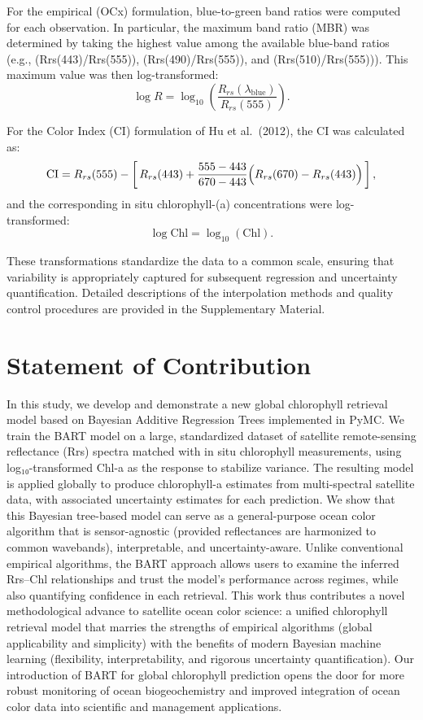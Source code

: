 \documentclass[
]{agujournal2019}
\begin{document}
For the empirical (OCx) formulation, blue-to-green band ratios were
computed for each observation. In particular, the maximum band ratio
(MBR) was determined by taking the highest value among the available
blue-band ratios (e.g., (Rrs(443)/Rrs(555)), (Rrs(490)/Rrs(555)), and
(Rrs(510)/Rrs(555))). This maximum value was then log-transformed: \[
\log R = \log_{10}\left(\frac{R_{rs}(\lambda_{\text{blue}})}{R_{rs}(555)}\right).
\]

For the Color Index (CI) formulation of Hu et al.~(2012), the CI was
calculated as: \[
\text{CI} = R_{rs}(555) - \left[\,R_{rs}(443) + \frac{555-443}{670-443}\Bigl(R_{rs}(670) - R_{rs}(443)\Bigr)\,\right],
\] and the corresponding in situ chlorophyll-(a) concentrations were
log-transformed: \[
\log \text{Chl} = \log_{10}(\text{Chl}).
\]

These transformations standardize the data to a common scale, ensuring
that variability is appropriately captured for subsequent regression and
uncertainty quantification. Detailed descriptions of the interpolation
methods and quality control procedures are provided in the Supplementary
Material.

\section{Statement of Contribution}\label{statement-of-contribution}

In this study, we develop and demonstrate a new global chlorophyll
retrieval model based on Bayesian Additive Regression Trees implemented
in PyMC. We train the BART model on a large, standardized dataset of
satellite remote-sensing reflectance (Rrs) spectra matched with in situ
chlorophyll measurements, using log₁₀-transformed Chl-a as the response
to stabilize variance. The resulting model is applied globally to
produce chlorophyll-a estimates from multi-spectral satellite data, with
associated uncertainty estimates for each prediction. We show that this
Bayesian tree-based model can serve as a general-purpose ocean color
algorithm that is sensor-agnostic (provided reflectances are harmonized
to common wavebands), interpretable, and uncertainty-aware. Unlike
conventional empirical algorithms, the BART approach allows users to
examine the inferred Rrs--Chl relationships and trust the model's
performance across regimes, while also quantifying confidence in each
retrieval. This work thus contributes a novel methodological advance to
satellite ocean color science: a unified chlorophyll retrieval model
that marries the strengths of empirical algorithms (global applicability
and simplicity) with the benefits of modern Bayesian machine learning
(flexibility, interpretability, and rigorous uncertainty
quantification). Our introduction of BART for global chlorophyll
prediction opens the door for more robust monitoring of ocean
biogeochemistry and improved integration of ocean color data into
scientific and management applications.
\end{document}
